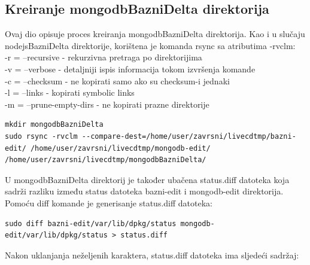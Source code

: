 \documentclass[12pt,vi]{mitthesis}
\begin{document}
\subsection*{Kreiranje mongodbBazniDelta direktorija}
\indent
Ovaj dio opisuje proces kreiranja mongodbBazniDelta direktorija.
Kao i u slučaju nodejsBazniDelta direktorije, korištena je komanda rsync sa atributima -rvclm:\\
\noindent
-r = --recursive - rekurzivna pretraga po direktorijima\\
\noindent
-v = --verbose - detaljniji ispis informacija tokom izvršenja komande\\
\noindent
-c = --checksum - ne kopirati samo ako su checksum-i jednaki\\
\noindent
-l = --links - kopirati symbolic links\\
\noindent
-m = --prune-empty-dirs - ne kopirati prazne direktorije\\
\begin{lstlisting}[style=BashInputStyle]
mkdir mongodbBazniDelta
sudo rsync -rvclm --compare-dest=/home/user/zavrsni/livecdtmp/bazni-edit/ /home/user/zavrsni/livecdtmp/mongodb-edit/ /home/user/zavrsni/livecdtmp/mongodbBazniDelta/
\end{lstlisting}
\noindent
U mongodbBazniDelta direktorij je također ubačena status.diff datoteka koja sadrži razliku između status datoteka bazni-edit i mongodb-edit direktorija. Pomoću diff komande je generisanje status.diff datoteka:
\begin{lstlisting}[style=BashInputStyle]
sudo diff bazni-edit/var/lib/dpkg/status mongodb-edit/var/lib/dpkg/status > status.diff
\end{lstlisting}
\noindent
Nakon uklanjanja neželjenih karaktera, status.diff datoteka ima sljedeći sadržaj:
\end{document}
